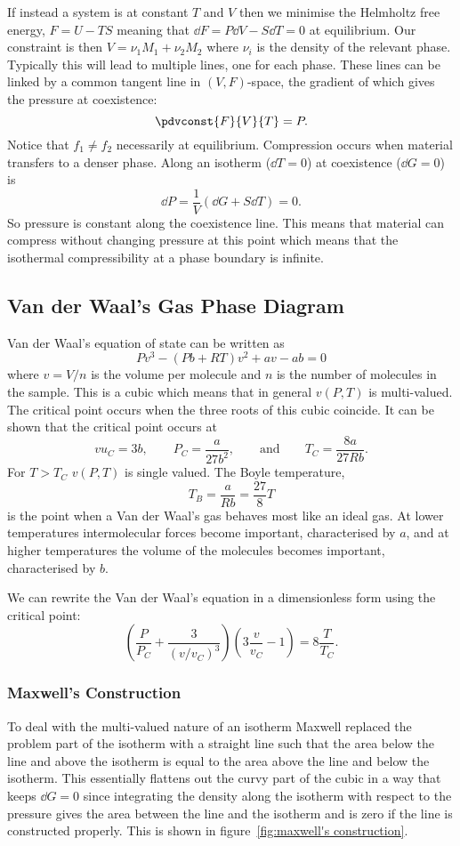     If instead a system is at constant \(T\) and \(V\) then we minimise the Helmholtz free energy, \(F = U - TS\) meaning that \(\dd{F} = P\dd{V} - S\dd{T} = 0\) at equilibrium.
    Our constraint is then \(V = \nu_1M_1 + \nu_2M_2\) where \(\nu_i\) is the density of the relevant phase.
    Typically this will lead to multiple lines, one for each phase.
    These lines can be linked by a common tangent line in \((V, F)\)-space, the gradient of which gives the pressure at coexistence:
    \[\pdvconst{F}{V}{T} = P.\]
    Notice that \(f_1 \ne f_2\) necessarily at equilibrium.
    Compression occurs when material transfers to a denser phase.
    Along an isotherm (\(\dd{T} = 0\)) at coexistence (\(\dd{G} = 0\)) is
    \[\dd{P} = \frac{1}{V}(\dd{G} + S\dd{T}) = 0.\]
    So pressure is constant along the coexistence line.
    This means that material can compress without changing pressure at this point which means that the isothermal compressibility at a phase boundary is infinite.
    
    \subsection{Van der Waal's Gas Phase Diagram}
    Van der Waal's equation of state can be written as
    \[Pv^3 - (Pb + RT)v^2 + av - ab = 0\]
    where \(v = V/n\) is the volume per molecule and \(n\) is the number of molecules in the sample.
    This is a cubic which means that in general \(v(P, T)\) is multi-valued.
    The critical point occurs when the three roots of this cubic coincide.
    It can be shown that the critical point occurs at
    \[vu_C = 3b, \qquad P_C = \frac{a}{27b^2}, \qquad\text{and}\qquad T_C = \frac{8a}{27Rb}.\]
    For \(T > T_C\) \(v(P, T)\) is single valued.
    The Boyle temperature,
    \[T_B = \frac{a}{Rb} = \frac{27}{8}T\]
    is the point when a Van der Waal's gas behaves most like an ideal gas.
    At lower temperatures intermolecular forces become important, characterised by \(a\), and at higher temperatures the volume of the molecules becomes important, characterised by \(b\).
    
    We can rewrite the Van der Waal's equation in a dimensionless form using the critical point:
    \[\left(\frac{P}{P_C} + \frac{3}{(v/v_C)^3}\right)\left(3\frac{v}{v_C} - 1\right) = 8\frac{T}{T_C}.\]
    
    \subsubsection{Maxwell's Construction}
    To deal with the multi-valued nature of an isotherm Maxwell replaced the problem part of the isotherm with a straight line such that the area below the line and above the isotherm is equal to the area above the line and below the isotherm.
    This essentially flattens out the curvy part of the cubic in a way that keeps \(\dd{G} = 0\) since integrating the density along the isotherm with respect to the pressure gives the area between the line and the isotherm and is zero if the line is constructed properly.
    This is shown in figure~\ref{fig:maxwell's construction}.
    
